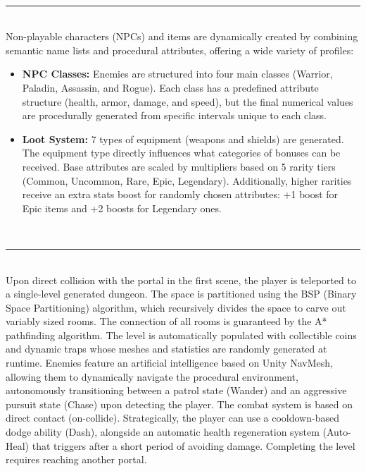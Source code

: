 \documentclass[11pt,a4paper]{article}
\begin{document}
\vspace{0.4cm}
 \\
\rule{\textwidth}{0.8pt} \\
Non-playable characters (NPCs) and items are dynamically created by combining semantic name lists and procedural attributes, offering a wide variety of profiles:
\begin{itemize}[itemsep=2pt, topsep=2pt, parsep=0pt, leftmargin=*]
    \item \textbf{NPC Classes:} Enemies are structured into four main classes (Warrior, Paladin, Assassin, and Rogue). Each class has a predefined attribute structure (health, armor, damage, and speed), but the final numerical values are procedurally generated from specific intervals unique to each class.
    \item \textbf{Loot System:} 7 types of equipment (weapons and shields) are generated. The equipment type directly influences what categories of bonuses can be received. Base attributes are scaled by multipliers based on 5 rarity tiers (Common, Uncommon, Rare, Epic, Legendary). Additionally, higher rarities receive an extra stats boost for randomly chosen attributes: +1 boost for Epic items and +2 boosts for Legendary ones.
\end{itemize}

\vspace{0.4cm}
 \\
\rule{\textwidth}{0.8pt} \\
Upon direct collision with the portal in the first scene, the player is teleported to a single-level generated dungeon. The space is partitioned using the BSP (Binary Space Partitioning) algorithm, which recursively divides the space to carve out variably sized rooms. The connection of all rooms is guaranteed by the A* pathfinding algorithm. The level is automatically populated with collectible coins and dynamic traps whose meshes and statistics are randomly generated at runtime. Enemies feature an artificial intelligence based on Unity NavMesh, allowing them to dynamically navigate the procedural environment, autonomously transitioning between a patrol state (Wander) and an aggressive pursuit state (Chase) upon detecting the player. The combat system is based on direct contact (on-collide). Strategically, the player can use a cooldown-based dodge ability (Dash), alongside an automatic health regeneration system (Auto-Heal) that triggers after a short period of avoiding damage. Completing the level requires reaching another portal.
\\[1.5cm]
\end{document}
